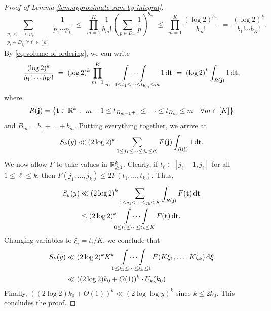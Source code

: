 \begin{proof}[Proof of Lemma \ref{lem:approximate-sum-by-integral}]
    \begin{equation*}
        \sum \limits_{\substack{p_1 < \dots < p_k \\ p_\ell \in D_{j_\ell} \; \forall \ell \in [k]}} \frac{1}{p_1 \cdots p_k} 
            \;\le\; \prod_{m = 1}^K \frac{1}{b_m!} \left(  \sum \limits_{p \in D_m} \frac{1}{p} \right)^{b_m} 
            \;\le \; \prod\limits_{m = 1}^K \frac{(\log 2)^{b_m}}{b_m!} 
            \; = \; \frac{(\log 2)^k}{b_1! \cdots b_K!}.
    \end{equation*}
    By \eqref{eq:volume-of-ordering}, we can write 
    \begin{equation*}
        \frac{(\log 2)^k}{b_1! \cdots b_K!} \;=\; (\log 2)^k \prod\limits_{m = 1}^K\;\; \idotsint \limits_{m - 1 \le t_1 \le \dots \le t_{b_m} \le m} 1\, \mathrm{d} \mathbf{t} \;=\; (\log 2)^k \int_{R(\mathbf{j})} 1\, \mathrm d \mathbf{t},
    \end{equation*}
    where 
    \begin{equation*}
        R(\mathbf{j}) = \left\{\mathbf{t} \in \mathbb{R}^{k}\,:\;m - 1 \le t_{B_{m - 1} + 1} \le \dots \le t_{B_m} \le m \quad \forall m \in [K]\right\}
    \end{equation*}
    and $B_m = b_1 + \dots + b_m$.
    Putting everything together, we arrive at
    \begin{equation*}
        S_k(y) \ll (2 \log 2)^k \sum \limits_{1 \le j_1 \le \dots \le j_k \le K} F(\mathbf{j}) \int_{R(\mathbf{j})} 1\, \mathrm d \mathbf{t}.
    \end{equation*}
    We now allow $F$ to take values in $\mathbb{R}^k_{\ge 0}$.
    Clearly, if $t_\ell \in [j_\ell - 1, j_\ell]$ for all $1 \le \ell \le k$, then $F(j_1, \dots, j_k) \le 2 F(t_1, \dots, t_k)$.
    Thus, 
    \begin{align*}
        S_k(y) &\ll (2 \log 2)^k \sum \limits_{1 \le j_1 \le \dots \le j_k \le K}  \int_{R(\mathbf{j})} F(\mathbf{t})\, \mathrm d \mathbf{t}\\
            &\le (2 \log 2)^k \idotsint\limits_{0 \le t_1 \le \dots \le t_k \le K} F(\mathbf{t})\, \mathrm{d} \mathbf{t}.
    \end{align*}
    Changing variables to $\xi_i = t_i / K$, we conclude that
    \begin{align*}
        S_k(y) &\ll (2 \log 2)^k K^k \idotsint\limits_{0 \le \xi_1 \le \dots \le \xi_k \le 1} F(K \xi_1, \dots, K\xi_k) \, \mathrm{d} \bm{\xi} \\
            &\ll ((2 \log 2) k_0 + O(1))^k  \cdot U_k(k_0) %
    \end{align*}
    Finally, $((2 \log 2) k_0 + O(1))^k \ll (2 \log \log y)^k$ since $k \le 2k_0$. 
    This concludes the proof.
\end{proof}

